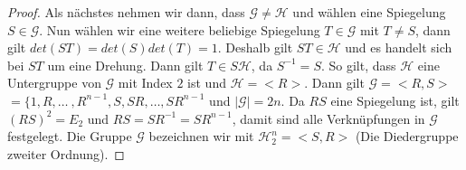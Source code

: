 \begin{proof}
Als nächstes nehmen wir dann, dass $\mathcal{G} \neq \mathcal{H}$ und wählen eine Spiegelung $S \in \mathcal{G}$. Nun wählen wir eine weitere beliebige Spiegelung $T \in \mathcal{G}$ mit $T \neq S$, dann gilt $det(ST)=det(S)det(T)=1$. Deshalb gilt $ST \in \mathcal{H}$ und es handelt sich bei $ST$ um eine Drehung. Dann gilt $T \in S\mathcal{H}$, da $S^{-1}=S$. So gilt, dass $\mathcal{H}$ eine Untergruppe von $\mathcal{G}$ mit Index $2$ ist und $\mathcal{H}=<R>$. Dann gilt $\mathcal{G}=<R,S>$ $=\{1,R,\dots \ ,R^{n-1},S,SR,\dots ,SR^{n-1}$ und $|\mathcal{G}|=2n$. Da $RS$ eine Spiegelung ist, gilt $(RS)^2=E_2$ und $RS=SR^{-1}=SR^{n-1}$, damit sind alle Verknüpfungen in $\mathcal{G}$ festgelegt. Die Gruppe $\mathcal{G}$ bezeichnen wir mit $\mathcal{H}^n_2=<S,R>$ (Die Diedergruppe zweiter Ordnung).                                                                                                                                                                                                                                                                                                                                                           
\end{proof}

